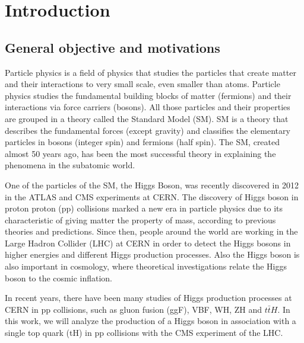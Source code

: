 
\chapter{Introduction}

\section{General objective and motivations}

Particle physics is a field of physics that studies the particles that create matter and their interactions to very small scale, even smaller than atoms. 
Particle physics studies the fundamental building blocks of matter (fermions) and their interactions via force carriers (bosons). 
All those particles and their properties are grouped in a theory called the Standard Model (SM). SM is a theory that describes the fundamental forces (except gravity) and classifies the elementary particles in bosons (integer spin) and fermions (half spin).
The SM, created almost 50 years ago, has been the most successful theory in explaining the phenomena in the subatomic world.

One of the particles of the SM, the Higgs Boson, was recently discovered in 2012 in the ATLAS and CMS experiments at CERN. The discovery of Higgs boson in proton proton (pp) collisions marked a new era in particle physics due to its characteristic of giving matter the property of mass, according to previous theories and predictions. Since then, people around the world are working in the Large Hadron Collider (LHC) at CERN in order to detect the Higgs bosons in higher energies and different Higgs production processes. 
Also the Higgs boson is also important in cosmology, where theoretical investigations relate the Higgs boson to the cosmic inflation.

In recent years, there have been many studies of Higgs production processes at CERN in pp collisions, such as gluon fusion (ggF), VBF, WH, ZH and $t\bar{t}H$. 
In this work, we will analyze the production of a Higgs boson in association with a
single top quark (tH) in pp collisions with the CMS experiment of the LHC. 

